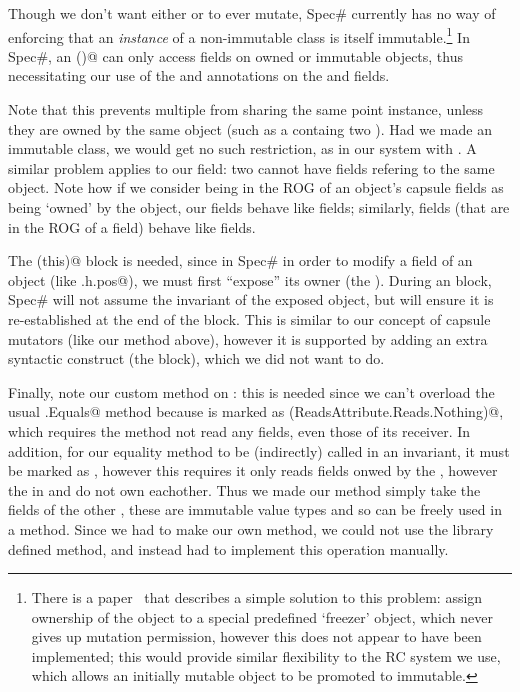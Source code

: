 Though we don't want either \Q@pos@ or \Q@path@ to ever mutate, Spec\# currently has no way of enforcing that an \emph{instance} of a non-immutable class is itself immutable.\footnote{There is a paper~\cite{DBLP:conf/vstte/LeinoMW08} that describes a simple solution to this problem: assign ownership of the object to a special predefined `freezer' object, which never gives up mutation permission, however this does not appear to have been implemented; this would provide similar flexibility to the RC system we use, which allows an initially mutable object to be promoted to immutable.} In Spec\#, an \Q@invariant()@ can only access fields on owned or immutable objects, thus necessitating our use of the \Q@Peer@ and \Q@Rep@ annotations on the \Q@pos@ and \Q@path@ fields.

Note that this prevents multiple \Q@Hamster@s from sharing the same point instance, unless they are owned by the same object (such as a \Q@DoubleCage@ containg two \Q@Hamster@s).  Had we made \Q@Point@ an immutable class, we would get no such restriction, as in our system with \Q@imm@ \Q@Point@s. A similar problem applies to our \Q@path@ field: two \Q@Cage@s cannot have \Q@path@ fields refering to the same object.
Note how if we consider being in the ROG of an object's capsule fields as being `owned' by the object, our \Q@capsule@ fields behave like \Q@Rep@ fields; similarly, \Q@mut@ fields (that are in the ROG of a \Q@capsule@ field) behave like \Q@Peer@ fields.

The \Q@expose(this)@ block is needed, since in Spec\# in order to modify a field of an object (like \Q@this.h.pos@), we must first ``expose'' its owner (the \Q@Cage@). During an \Q@expose@ block, Spec\# will not assume the invariant of the exposed object, but will ensure it is re-established at the end of the block. This is similar to our concept of capsule mutators (like our \Q@moveTo@ method above), however it is supported by adding an extra syntactic construct (the \Q@expose@ block), which we did not want to do.

Finally, note our custom \Q@Equal@ method on \Q@Point@: this is needed since we can't overload the usual \Q@Object.Equals@ method because is marked as \Q@Reads(ReadsAttribute.Reads.Nothing)@, which requires the method not read any fields, even those of its receiver. In addition, for our equality method to be (indirectly) called in an invariant, it must be marked as \Q@Pure@, however this requires it only reads fields onwed by the \Q@receiver@, however the \Q@Point@s in \Q@path@ and \Q@Hamster@ do not own eachother.  Thus we made our \Q@Equal@ method simply take the fields of the other \Q@Point@, these are immutable value types and so can be freely used in a \Q@Pure@ method. Since we had to make our own \Q@Equal@ method, we could not use the library defined \Q@Contains@ method, and instead had to implement this operation manually.

